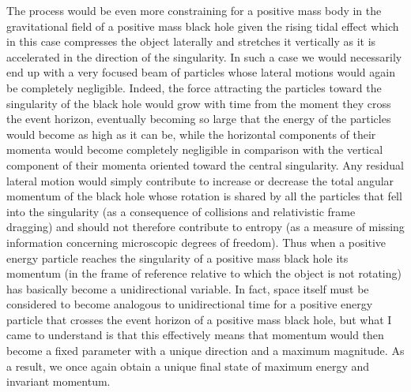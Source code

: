 \documentclass[notitlepage,12pt]{report}
\begin{document}
The process would be even more constraining for a positive mass body in the gravitational field of a positive mass black hole given the rising tidal effect which in this case compresses the object laterally and stretches it vertically as it is accelerated in the direction of the singularity. In such a case we would necessarily end up with a very focused beam of particles whose lateral motions would again be completely negligible. Indeed, the force attracting the particles toward the singularity of the black hole would grow with time from the moment they cross the event horizon, eventually becoming so large that the energy of the particles would become as high as it can be, while the horizontal components of their momenta would become completely negligible in comparison with the vertical component of their momenta oriented toward the central singularity. Any residual lateral motion would simply contribute to increase or decrease the total angular momentum of the black hole whose rotation is shared by all the particles that fell into the singularity (as a consequence of collisions and relativistic frame dragging) and should not therefore contribute to entropy (as a measure of missing information concerning microscopic degrees of freedom). Thus when a positive energy particle reaches the singularity of a positive mass black hole its momentum (in the frame of reference relative to which the object is not rotating) has basically become a unidirectional variable. In fact, space itself must be considered to become analogous to unidirectional time for a positive energy particle that crosses the event horizon of a positive mass black hole, but what I came to understand is that this effectively means that momentum would then become a fixed parameter with a unique direction and a maximum magnitude. As a result, we once again obtain a unique final state of maximum energy and invariant momentum.
\end{document}

